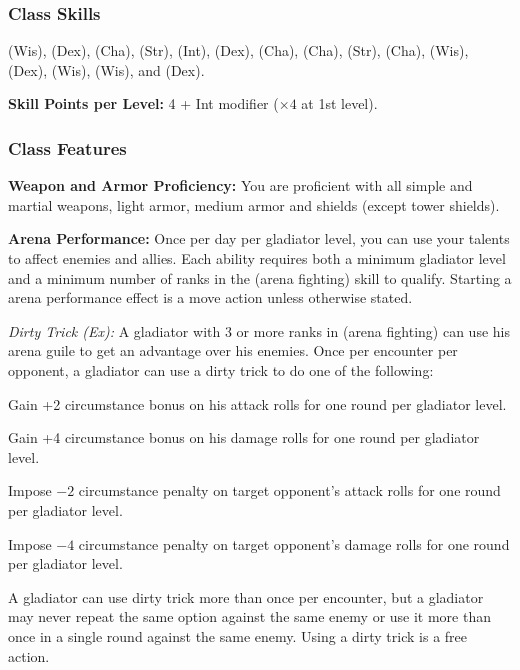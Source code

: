 \subsubsection{Class Skills}
 (Wis),  (Dex),  (Cha),  (Str),  (Int),  (Dex),  (Cha),  (Cha),  (Str),  (Cha),  (Wis),  (Dex),  (Wis),  (Wis), and  (Dex).

\textbf{Skill Points per Level:} 4 + Int modifier ($\times4$ at 1st level).

\subsubsection{Class Features}
\textbf{Weapon and Armor Proficiency:} You are proficient with all simple and martial weapons, light armor, medium armor and shields (except tower shields).

\textbf{Arena Performance:} Once per day per gladiator level, you can use your talents to affect enemies and allies. Each ability requires both a minimum gladiator level and a minimum number of ranks in the  (arena fighting) skill to qualify. Starting a arena performance effect is a move action unless otherwise stated.

\textit{Dirty Trick (Ex):} A gladiator with 3 or more ranks in  (arena fighting) can use his arena guile to get an advantage over his enemies. Once per encounter per opponent, a gladiator can use a dirty trick to do one of the following:

\begin{itemize*}
\item Gain +2 circumstance bonus on his attack rolls for one round per gladiator level.
\item Gain +4 circumstance bonus on his damage rolls for one round per gladiator level.
\item Impose $-2$ circumstance penalty on target opponent's attack rolls for one round per gladiator level.
\item Impose $-4$ circumstance penalty on target opponent's damage rolls for one round per gladiator level.
\end{itemize*}

A gladiator can use dirty trick more than once per encounter, but a gladiator may never repeat the same option against the same enemy or use it more than once in a single round against the same enemy. Using a dirty trick is a free action.

